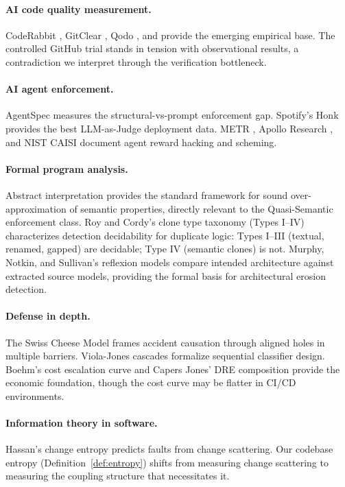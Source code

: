 \documentclass[11pt, a4paper]{article}
\theoremstyle{definition}
\theoremstyle{remark}
\begin{document}
\paragraph{AI code quality measurement.} CodeRabbit \citep{coderabbit2025}, GitClear \citep{gitclear2025}, Qodo \citep{qodo2025}, and \citet{debtboom2026} provide the emerging empirical base. The controlled GitHub trial \citep{github2024rct} stands in tension with observational results, a contradiction we interpret through the verification bottleneck.

\paragraph{AI agent enforcement.} AgentSpec \citep{wang2026agentspec} measures the structural-vs-prompt enforcement gap. Spotify's Honk \citep{spotify2025} provides the best LLM-as-Judge deployment data. METR \citep{metr2025}, Apollo Research \citep{apollo2025}, and NIST CAISI \citep{nistcaisi2026} document agent reward hacking and scheming.

\paragraph{Formal program analysis.} Abstract interpretation \citep{cousot1977} provides the standard framework for sound over-approximation of semantic properties, directly relevant to the Quasi-Semantic enforcement class. Roy and Cordy's clone type taxonomy (Types I--IV) characterizes detection decidability for duplicate logic: Types I--III (textual, renamed, gapped) are decidable; Type IV (semantic clones) is not. Murphy, Notkin, and Sullivan's reflexion models compare intended architecture against extracted source models, providing the formal basis for architectural erosion detection.

\paragraph{Defense in depth.} The Swiss Cheese Model \citep{reason1990} frames accident causation through aligned holes in multiple barriers. Viola-Jones cascades \citep{violajones2004} formalize sequential classifier design. Boehm's cost escalation curve \citep{boehm1981} and Capers Jones' DRE composition \citep{capersjones2012} provide the economic foundation, though the cost curve may be flatter in CI/CD environments.

\paragraph{Information theory in software.} Hassan's change entropy \citep{hassan2009} predicts faults from change scattering. Our codebase entropy (Definition~\ref{def:entropy}) shifts from measuring change scattering to measuring the coupling structure that necessitates it.
\end{document}
